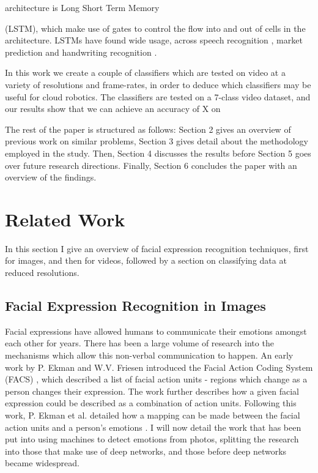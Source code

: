 \documentclass[sigconf]{acmart}
\begin{document}
architecture is Long Short Term Memory \cite{hochreiter1997long} {(LSTM), which make use of gates to
control the flow into and out of cells in the architecture. LSTMs have found
wide usage, across speech recognition \cite{graves2005framewise}, market prediction
\cite{islam2020foreign} and handwriting recognition \cite{graves2008unconstrained}.

In this work we create a couple of classifiers which are tested on video at a
variety of resolutions and frame-rates, in order to deduce which classifiers
may be useful for cloud robotics. The classifiers are tested on a 7-class
video dataset, and our results show that we can achieve an accuracy of X on

The rest of the paper is structured as follows: Section 2 gives an overview of
previous work on similar problems, Section 3 gives detail about the
methodology employed in the study. Then, Section 4 discusses the results
before Section 5 goes over future research directions. Finally, Section 6
concludes the paper with an overview of the findings. 

\section{Related Work}

In this section I give an overview of facial expression recognition
techniques, first for images, and then for videos, followed by a section 
on classifying data at reduced resolutions. 

\subsection{Facial Expression Recognition in Images}

Facial expressions have allowed humans to communicate their emotions amongst
each other for years. There has been a large volume of research into the
mechanisms which allow this non-verbal communication to happen. An early work
by P. Ekman and W.V. Friesen introduced the Facial Action Coding System
(FACS) \cite{friesen1978facial}, which described a list of facial action units
- regions which change as a person changes their expression. The work further describes
how a given facial expression could be described as a combination of action
units. Following this work, P. Ekman et al. detailed how a mapping can be made
between the facial action units and a person's emotions \cite{ekman1997face}. 
I will now detail the work that has been put into using machines to detect
emotions from photos, splitting the research into those that make use of deep
networks, and those before deep networks became widespread. 

}
\end{document}
